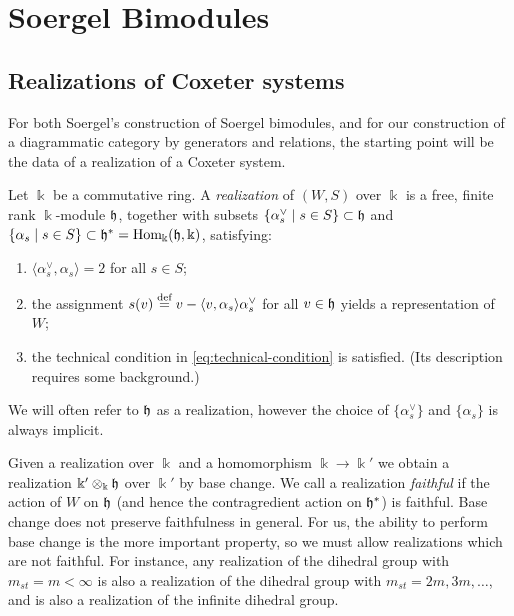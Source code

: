 

\section{Soergel Bimodules}
\label{sec-sbim}

\subsection{Realizations of Coxeter systems} \label{subsec-realization}

For both Soergel's construction of Soergel bimodules, and for our construction of a diagrammatic category by generators and relations, the starting point will be the data of a realization
of a Coxeter system.

\begin{defn} \label{defn:realization} Let $\Bbbk$ be a commutative ring. A \emph{realization} of $(W,S)$ over $\Bbbk$ is a free, finite rank $\Bbbk$-module ${\mathfrak h}$, together with subsets $\{ \alpha_s^\vee \; | \; s \in S\} \subset {\mathfrak h}$ and $\{ \alpha_s \; | \; s \in S\} \subset {\mathfrak h}^* = \operatorname{Hom}_{\Bbbk}({\mathfrak h},\Bbbk)$, satisfying:
\begin{enumerate}
\item $\langle \alpha_s^\vee, \alpha_s \rangle = 2$ for all $s \in S$;
\item the assignment $s(v) \stackrel{\mbox{\scriptsize{def}}}{=} v - \langle v, \alpha_s\rangle \alpha_s^{\vee}$ for all $v \in {\mathfrak h}$ yields a representation of $W$;
\item the technical condition in \eqref{eq:technical-condition} is satisfied. (Its description requires some background.)
\end{enumerate}
We will often refer to ${\mathfrak h}$ as a realization, however the choice of $\{ \alpha_s^\vee \}$ and $\{\alpha_s \}$ is always implicit. \end{defn}


Given a realization over $\Bbbk$ and a homomorphism $\Bbbk \to \Bbbk'$ we obtain a realization $\Bbbk' \otimes_{\Bbbk} {\mathfrak h}$ over $\Bbbk'$ by base change. We call a realization
\emph{faithful} if the action of $W$ on ${\mathfrak h}$ (and hence the contragredient action on ${\mathfrak h}^*$) is faithful. Base change does not preserve faithfulness in general. For us, the ability to
perform base change is the more important property, so we must allow realizations which are not faithful. For instance, any realization of the dihedral group with $m_{st}=m<\infty$ is also
a realization of the dihedral group with $m_{st}=2m, 3m, \ldots$, and is also a realization of the infinite dihedral group.

